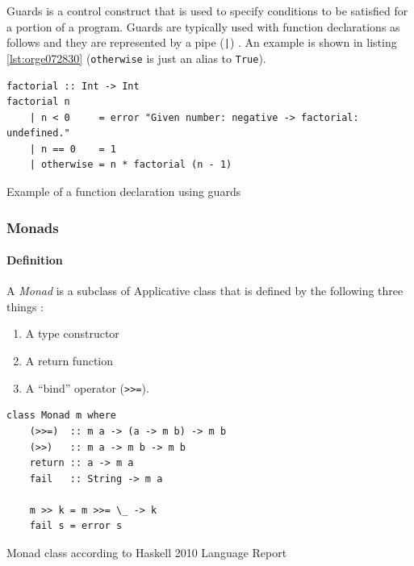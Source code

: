 \documentclass[a4paper, titlepage, twoside]{article}
\begin{document}
Guards is a control construct that is used to specify conditions to be satisfied for a portion of a program. Guards are typically used with function declarations as follows and they are represented by a pipe (\texttt{|}) \autocite{kremerCPSC449Programming2015}. An example is shown in listing \ref{lst:orge072830} (\texttt{otherwise} is just an alias to \texttt{True}).

\begin{listing}[htbp]
\begin{verbatim}
factorial :: Int -> Int
factorial n
    | n < 0     = error "Given number: negative -> factorial: undefined."
    | n == 0    = 1
    | otherwise = n * factorial (n - 1)
\end{verbatim}
\caption{\label{lst:orge072830}Example of a function declaration using guards}
\end{listing}

\subsubsection{Monads}
\label{sec:orgd9c923f}

\paragraph*{Definition}
\label{sec:org050d25b}

A \emph{Monad} is a subclass of Applicative class that is defined by the following three things \autocite{wikibooksHaskellUnderstandingMonads2021}:

\begin{enumerate}
\item A type constructor
\item A return function
\item A ``bind'' operator (\texttt{>{}>{}=}).
\end{enumerate}

\begin{listing}[htbp]
\begin{verbatim}
class Monad m where
    (>>=)  :: m a -> (a -> m b) -> m b
    (>>)   :: m a -> m b -> m b
    return :: a -> m a
    fail   :: String -> m a
    
    m >> k = m >>= \_ -> k
    fail s = error s
\end{verbatim}
\caption{Monad class according to Haskell 2010 Language Report \autocite[chapter 6.3.6]{marlowHaskell2010Language2010}}
\end{listing}
\end{document}
